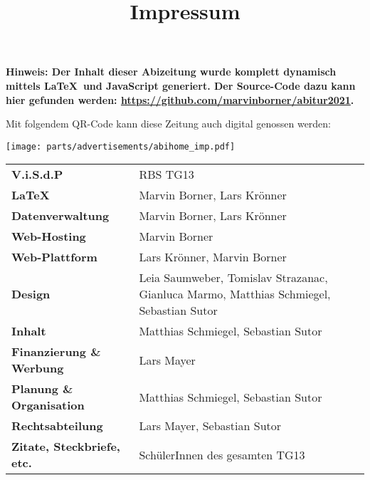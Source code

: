 \title{Impressum}


\textbf{Hinweis: Der Inhalt dieser Abizeitung wurde komplett dynamisch mittels \LaTeX\  und JavaScript generiert. Der Source-Code dazu kann hier gefunden werden: \url{https://github.com/marvinborner/abitur2021}.}

Mit folgendem QR-Code kann diese Zeitung auch digital genossen werden:

\begin{center}
\end{center}

\texttt{[image: parts/advertisements/abihome\_imp.pdf]}

\begin{table}[b]
	\begin{tabular}{ l l }
		\textbf{V.i.S.d.P}                 & RBS TG13                                                                                \\ %
		\textbf{\LaTeX}                    & Marvin Borner, Lars Krönner                                                             \\
		\textbf{Datenverwaltung}           & Marvin Borner, Lars Krönner                                                             \\
		\textbf{Web-Hosting}               & Marvin Borner                                                                           \\
		\textbf{Web-Plattform}             & Lars Krönner, Marvin Borner                                                             \\
		\textbf{Design}                    & Leia Saumweber, Tomislav Strazanac, Gianluca Marmo, Matthias Schmiegel, Sebastian Sutor \\
		\textbf{Inhalt}                    & Matthias Schmiegel, Sebastian Sutor                                                     \\
		\textbf{Finanzierung \& Werbung}   & Lars Mayer                                                                              \\
		\textbf{Planung \& Organisation}   & Matthias Schmiegel, Sebastian Sutor                                                     \\
		\textbf{Rechtsabteilung}           & Lars Mayer, Sebastian Sutor                                                             \\
		\textbf{Zitate, Steckbriefe, etc.} & SchülerInnen des gesamten TG13
	\end{tabular}
\end{table}
